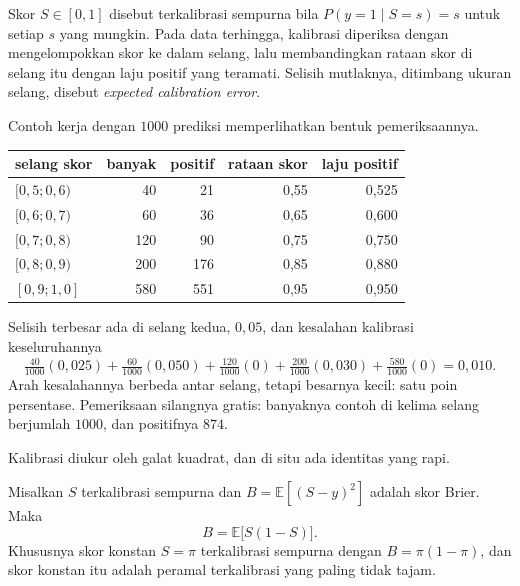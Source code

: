 
\begin{definisi}
Skor $S\in[0,1]$ disebut terkalibrasi sempurna bila
$P(y=1\mid S=s)=s$ untuk setiap $s$ yang mungkin. Pada data terhingga, kalibrasi diperiksa
dengan mengelompokkan skor ke dalam selang, lalu membandingkan rataan skor di selang itu
dengan laju positif yang teramati. Selisih mutlaknya, ditimbang ukuran selang, disebut
\emph{expected calibration error}.
\end{definisi}

Contoh kerja dengan $1000$ prediksi memperlihatkan bentuk pemeriksaannya.

\begin{center}
\small
\begin{tabular}{lrrrr}
\hline
selang skor & banyak & positif & rataan skor & laju positif \\
\hline
$[0{,}5;0{,}6)$ & 40 & 21 & 0,55 & 0,525 \\
$[0{,}6;0{,}7)$ & 60 & 36 & 0,65 & 0,600 \\
$[0{,}7;0{,}8)$ & 120 & 90 & 0,75 & 0,750 \\
$[0{,}8;0{,}9)$ & 200 & 176 & 0,85 & 0,880 \\
$[0{,}9;1{,}0]$ & 580 & 551 & 0,95 & 0,950 \\
\hline
\end{tabular}
\end{center}

Selisih terbesar ada di selang kedua, $0{,}05$, dan kesalahan kalibrasi keseluruhannya
\[
\tfrac{40}{1000}(0{,}025)+\tfrac{60}{1000}(0{,}050)+\tfrac{120}{1000}(0)
+\tfrac{200}{1000}(0{,}030)+\tfrac{580}{1000}(0)=0{,}010 .
\]
Arah kesalahannya berbeda antar selang, tetapi besarnya kecil: satu poin persentase. Pemeriksaan silangnya gratis: banyaknya
contoh di kelima selang berjumlah $1000$, dan positifnya $874$.

Kalibrasi diukur oleh galat kuadrat, dan di situ ada identitas yang rapi.

\begin{proposisi}
Misalkan $S$ terkalibrasi sempurna dan $B=\mathbb{E}[(S-y)^2]$ adalah skor Brier. Maka
\[
B=\mathbb{E}\bigl[S(1-S)\bigr].
\]
Khususnya skor konstan $S=\pi$ terkalibrasi sempurna dengan $B=\pi(1-\pi)$, dan skor
konstan itu adalah peramal terkalibrasi yang paling tidak tajam.
\end{proposisi}

